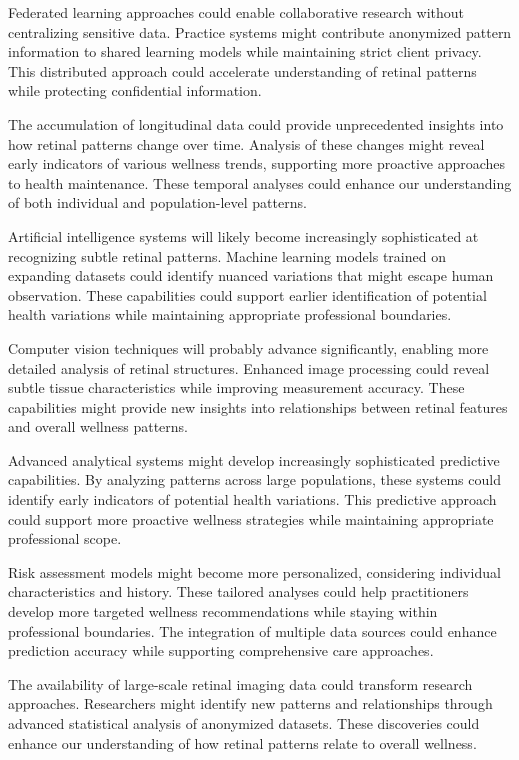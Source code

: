 \documentclass[
  Letterpaper,
]{scrbook}
\begin{document}
Federated learning approaches could enable collaborative research
without centralizing sensitive data. Practice systems might contribute
anonymized pattern information to shared learning models while
maintaining strict client privacy. This distributed approach could
accelerate understanding of retinal patterns while protecting
confidential information.

The accumulation of longitudinal data could provide unprecedented
insights into how retinal patterns change over time. Analysis of these
changes might reveal early indicators of various wellness trends,
supporting more proactive approaches to health maintenance. These
temporal analyses could enhance our understanding of both individual and
population-level patterns.

Artificial intelligence systems will likely become increasingly
sophisticated at recognizing subtle retinal patterns. Machine learning
models trained on expanding datasets could identify nuanced variations
that might escape human observation. These capabilities could support
earlier identification of potential health variations while maintaining
appropriate professional boundaries.

Computer vision techniques will probably advance significantly, enabling
more detailed analysis of retinal structures. Enhanced image processing
could reveal subtle tissue characteristics while improving measurement
accuracy. These capabilities might provide new insights into
relationships between retinal features and overall wellness patterns.

Advanced analytical systems might develop increasingly sophisticated
predictive capabilities. By analyzing patterns across large populations,
these systems could identify early indicators of potential health
variations. This predictive approach could support more proactive
wellness strategies while maintaining appropriate professional scope.

Risk assessment models might become more personalized, considering
individual characteristics and history. These tailored analyses could
help practitioners develop more targeted wellness recommendations while
staying within professional boundaries. The integration of multiple data
sources could enhance prediction accuracy while supporting comprehensive
care approaches.

The availability of large-scale retinal imaging data could transform
research approaches. Researchers might identify new patterns and
relationships through advanced statistical analysis of anonymized
datasets. These discoveries could enhance our understanding of how
retinal patterns relate to overall wellness.
\end{document}
